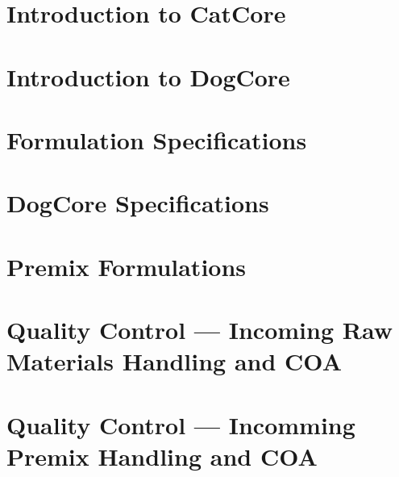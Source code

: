 \documentclass[11pt,oneside]{book}
\begin{document}
\chapter{Introduction to CatCore}



\chapter{Introduction to DogCore}


\pagestyle{headings}

\chapter{Formulation Specifications}

\chapter{DogCore Specifications}

\chapter{Premix Formulations}

\newpage

\newpage



\newpage



\chapter{Quality Control --- Incoming Raw Materials Handling and COA}



\chapter{Quality Control --- Incomming Premix Handling and COA}

\newpage


\newpage


\newpage

\newpage

\end{document}
